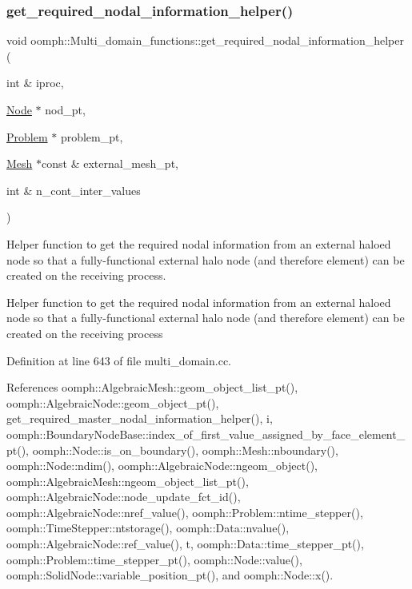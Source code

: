 \subsubsection{\texorpdfstring{get\+\_\+required\+\_\+nodal\+\_\+information\+\_\+helper()}{get\_required\_nodal\_information\_helper()}}
{\footnotesize\ttfamily void oomph\+::\+Multi\+\_\+domain\+\_\+functions\+::get\+\_\+required\+\_\+nodal\+\_\+information\+\_\+helper (\begin{DoxyParamCaption}\item[{int \&}]{iproc,  }\item[{\hyperlink{classoomph_1_1Node}{Node} $\ast$}]{nod\+\_\+pt,  }\item[{\hyperlink{classoomph_1_1Problem}{Problem} $\ast$}]{problem\+\_\+pt,  }\item[{\hyperlink{classoomph_1_1Mesh}{Mesh} $\ast$const \&}]{external\+\_\+mesh\+\_\+pt,  }\item[{int \&}]{n\+\_\+cont\+\_\+inter\+\_\+values }\end{DoxyParamCaption})}



Helper function to get the required nodal information from an external haloed node so that a fully-\/functional external halo node (and therefore element) can be created on the receiving process. 

Helper function to get the required nodal information from an external haloed node so that a fully-\/functional external halo node (and therefore element) can be created on the receiving process 

Definition at line 643 of file multi\+\_\+domain.\+cc.



References oomph\+::\+Algebraic\+Mesh\+::geom\+\_\+object\+\_\+list\+\_\+pt(), oomph\+::\+Algebraic\+Node\+::geom\+\_\+object\+\_\+pt(), get\+\_\+required\+\_\+master\+\_\+nodal\+\_\+information\+\_\+helper(), i, oomph\+::\+Boundary\+Node\+Base\+::index\+\_\+of\+\_\+first\+\_\+value\+\_\+assigned\+\_\+by\+\_\+face\+\_\+element\+\_\+pt(), oomph\+::\+Node\+::is\+\_\+on\+\_\+boundary(), oomph\+::\+Mesh\+::nboundary(), oomph\+::\+Node\+::ndim(), oomph\+::\+Algebraic\+Node\+::ngeom\+\_\+object(), oomph\+::\+Algebraic\+Mesh\+::ngeom\+\_\+object\+\_\+list\+\_\+pt(), oomph\+::\+Algebraic\+Node\+::node\+\_\+update\+\_\+fct\+\_\+id(), oomph\+::\+Algebraic\+Node\+::nref\+\_\+value(), oomph\+::\+Problem\+::ntime\+\_\+stepper(), oomph\+::\+Time\+Stepper\+::ntstorage(), oomph\+::\+Data\+::nvalue(), oomph\+::\+Algebraic\+Node\+::ref\+\_\+value(), t, oomph\+::\+Data\+::time\+\_\+stepper\+\_\+pt(), oomph\+::\+Problem\+::time\+\_\+stepper\+\_\+pt(), oomph\+::\+Node\+::value(), oomph\+::\+Solid\+Node\+::variable\+\_\+position\+\_\+pt(), and oomph\+::\+Node\+::x().



